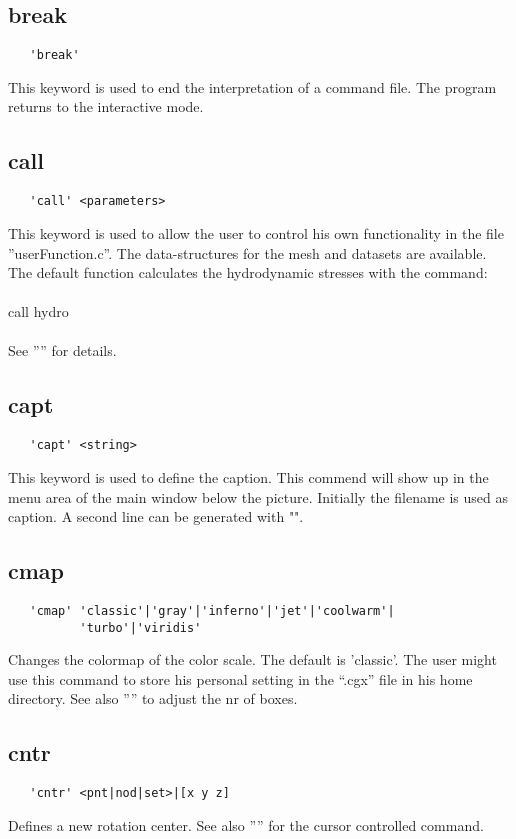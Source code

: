 \documentclass{article}
\begin{document}
\subsection{\label{break}break}
\begin{verbatim}
   'break'
\end{verbatim}
This keyword is used to end the interpretation of a command file. The program returns to the interactive mode.

\subsection{\label{call}call}
\begin{verbatim}
   'call' <parameters>
\end{verbatim}
This keyword is used to allow the user to control his own functionality in the file ''userFunction.c''. The data-structures for the mesh and datasets are available. The default function calculates the hydrodynamic stresses with the command:\\\\call hydro\\\\See '''' for  details. 

\subsection{\label{capt}capt}
\begin{verbatim}
   'capt' <string> 
\end{verbatim}
This keyword is used to define the caption. This commend will show up in the
menu area of the main window below the picture. Initially the filename is used
as caption. A second line can be generated with "".

\subsection{\label{cmap}cmap}
\begin{verbatim}
   'cmap' 'classic'|'gray'|'inferno'|'jet'|'coolwarm'|
          'turbo'|'viridis'
\end{verbatim}
Changes the colormap of the color scale. The default is 'classic'. The user might use this command to store his personal setting in the ``.cgx'' file in his home directory. See also '''' to adjust the nr of boxes.

\subsection{\label{cntr}cntr}
\begin{verbatim}
   'cntr' <pnt|nod|set>|[x y z]
\end{verbatim}
Defines a new rotation center. See also '''' for the cursor controlled command.
\end{document}
